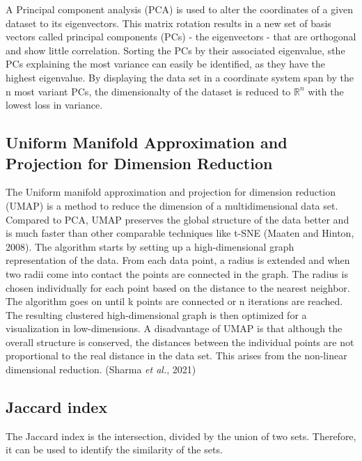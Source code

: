 \documentclass[
  parskip,
  oneside]{scrreprt}
\begin{document}
A Principal component analysis (PCA) is used to alter the coordinates of
a given dataset to its eigenvectors. This matrix rotation results in a
new set of basis vectors called principal components (PCs) - the
eigenvectors - that are orthogonal and show little correlation. Sorting
the PCs by their associated eigenvalue, sthe PCs explaining the most
variance can easily be identified, as they have the highest eigenvalue.
By displaying the data set in a coordinate system span by the n most
variant PCs, the dimensionalty of the dataset is reduced to
\(\mathbb{R}^n\) with the lowest loss in variance.

\hypertarget{uniform-manifold-approximation-and-projection-for-dimension-reduction}{%
\subsection{Uniform Manifold Approximation and Projection for Dimension
Reduction}\label{uniform-manifold-approximation-and-projection-for-dimension-reduction}}

The Uniform manifold approximation and projection for dimension
reduction (UMAP) is a method to reduce the dimension of a
multidimensional data set. Compared to PCA, UMAP preserves the global
structure of the data better and is much faster than other comparable
techniques like t-SNE (Maaten and Hinton, 2008). The algorithm starts by
setting up a high-dimensional graph representation of the data. From
each data point, a radius is extended and when two radii come into
contact the points are connected in the graph. The radius is chosen
individually for each point based on the distance to the nearest
neighbor. The algorithm goes on until k points are connected or n
iterations are reached. The resulting clustered high-dimensional graph
is then optimized for a visualization in low-dimensions. A disadvantage
of UMAP is that although the overall structure is conserved, the
distances between the individual points are not proportional to the real
distance in the data set. This arises from the non-linear dimensional
reduction. (Sharma \emph{et al.}, 2021)

\hypertarget{jaccard-index}{%
\subsection{Jaccard index}\label{jaccard-index}}

The Jaccard index is the intersection, divided by the union of two sets.
Therefore, it can be used to identify the similarity of the sets.
\end{document}

